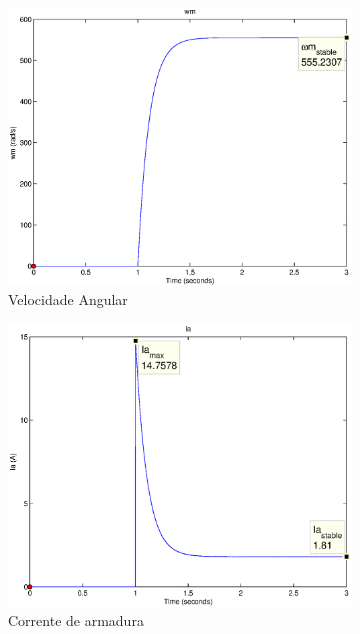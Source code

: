 \documentclass{article}
\begin{document}
\begin{figure}[H]
	\centering
	\begin{subfigure}[b]{0.49\linewidth}
		\includegraphics[width=\linewidth]{matlab/wm1}
		\caption{Velocidade Angular}
	\end{subfigure}
	\begin{subfigure}[b]{0.49\linewidth}
		\centering
		\includegraphics[width=\linewidth]{matlab/ia1}
		\caption{Corrente de armadura}
	\end{subfigure}
	\begin{subfigure}[b]{0.49\linewidth}

\end{subfigure}
\end{figure}
\end{document}
